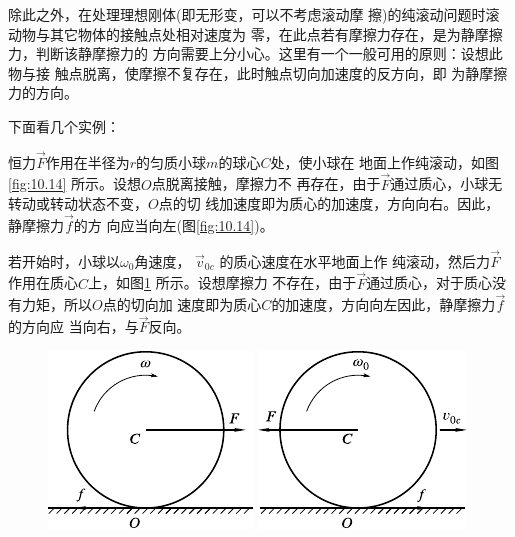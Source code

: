 除此之外，在处理理想刚体(即无形变，可以不考虑滚动摩
擦)的纯滚动问题时滚动物与其它物体的接触点处相对速度为
零，在此点若有摩擦力存在，是为静摩擦力，判断该静摩擦力的
方向需要上分小心。这里有一个一般可用的原则：设想此物与接
触点脱离，使摩擦不复存在，此时触点切向加速度的反方向，即
为静摩擦力的方向。

下面看几个实例：

恒力$\vec{ F }$作用在半径为$ r $的匀质小球$ m $的球心$ C $处，使小球在
地面上作纯滚动，如图\ref{fig:10.14} 所示。设想$ O $点脱离接触，摩擦力不
再存在，由于$\vec{ F }$通过质心，小球无转动或转动状态不变，$ O $点的切
线加速度即为质心的加速度，方向向右。因此，静摩擦力$ \vec{f} $的方
向应当向左(图\ref{fig:10.14})。

若开始时，小球以$ \omega_{ 0 } $角速度， $ \vec{v} _ { 0c } $ 的质心速度在水平地面上作
纯滚动，然后力$\vec{F}$作用在质心$ C $上，如图\ref{fig:10.15} 所示。设想摩擦力
不存在，由于$\vec{ F }$通过质心，对于质心没有力矩，所以$ O $点的切向加
速度即为质心$ C $的加速度，方向向左因此，静摩擦力$\vec{f}$的方向应
当向右，与$\vec{F}$反向。

\begin{figure}[h]
  \begin{minipage}{0.5\linewidth}
    \centering
    \includegraphics{figure/fig10.14}
    \caption{}
    \label{fig:10.14}
  \end{minipage}
  \begin{minipage}{0.5\linewidth}
    \centering
    \includegraphics{figure/fig10.15}
    \caption{}
    \label{fig:10.15}
  \end{minipage}
\end{figure}

